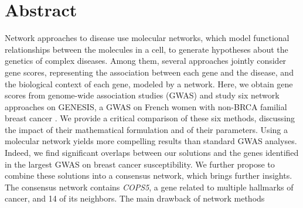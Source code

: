 \documentclass[10pt,letterpaper]{article}
\begin{document}
\section*{Abstract}
Network approaches to disease use molecular networks, which model functional relationships between the molecules in a cell, to generate hypotheses about the genetics of complex diseases.
Among them, several approaches jointly consider gene scores, representing the association between each gene and the disease, and the biological context of each gene, modeled by a network.
Here, we obtain gene scores from genome-wide association studies (GWAS) and study six network approaches on 
GENESIS, a GWAS on French women with non-BRCA familial breast cancer%
. We provide a critical comparison of these six methods, discussing the impact of their mathematical formulation and of their parameters. %
Using a molecular network yields more compelling results than standard %
GWAS analyses. Indeed, %
we find significant overlaps between our solutions and the genes identified in the largest GWAS on breast cancer susceptibility. %
We further
propose to combine these solutions into a consensus network, %
which
brings further insights. The consensus network contains \emph{COPS5}, a gene related to multiple hallmarks of cancer, and 14 of its neighbors. The main drawback of network methods %
\end{document}
